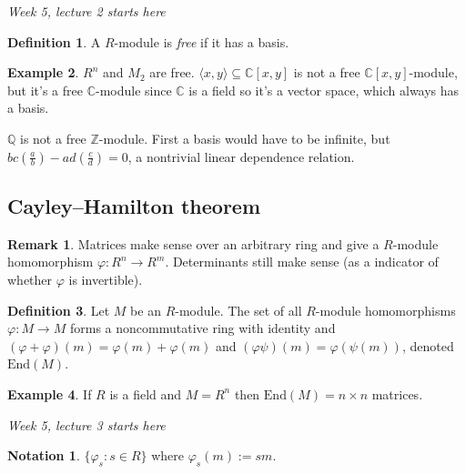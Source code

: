 \documentclass[a4paper]{article}
\newcommand{\End}{\text{End}}
\theoremstyle{definition}
\newtheorem{defn}{Definition}[subsection]
\newtheorem{example}[defn]{Example}
\newtheorem*{remark}{Remark}
\newtheorem*{notation}{Notation}
\begin{document}
\begin{flushright}
\textit{Week 5, lecture 2 starts here}
\end{flushright}

\begin{defn}
A $R$-module is \textit{free} if it has a basis.
\end{defn}
\begin{example}
$R^n$ and $M_2$ are free. $\langle x,y\rangle \subseteq \mathbb C[x,y]$ is not a free $\mathbb C[x,y]$-module, but it's a free $\mathbb C$-module since $\mathbb C$ is a field so it's a vector space, which always has a basis.

$\mathbb Q$ is not a free $\mathbb Z$-module. First a basis would have to be infinite, but $bc\left(\frac{a}{b}\right)-ad\left(\frac{c}{d}\right)=0$, a nontrivial linear dependence relation.
\end{example}

\subsection{Cayley–Hamilton theorem}
\begin{remark}
Matrices make sense over an arbitrary ring and give a $R$-module homomorphism $\varphi:R^n\rightarrow R^m$. Determinants still make sense (as a indicator of whether $\varphi$ is invertible).
\end{remark}

\begin{defn}
Let $M$ be an $R$-module. The set of all $R$-module homomorphisms $\varphi:M\rightarrow M$ forms a noncommutative ring with identity and $(\varphi+\varphi)(m)=\varphi(m)+\varphi(m)$ and $(\varphi\psi)(m)=\varphi(\psi(m))$, denoted $\End(M)$.
\end{defn}
\begin{example}
If $R$ is a field and $M=R^n$ then $\End(M)=n\times n$ matrices.
\end{example}

\begin{flushright}
\textit{Week 5, lecture 3 starts here}
\end{flushright}

\begin{notation}
$\{\varphi_s:s\in R\}$ where $\varphi_s(m):=sm$.
\end{notation}
\end{document}
